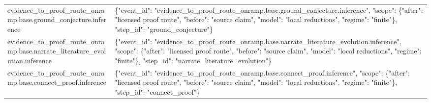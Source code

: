 \documentclass[10pt,a4paper]{article}
\begin{document}
\begin{longtable}{@{}>{\raggedright\arraybackslash}p{.20\linewidth}>{\raggedright\arraybackslash}p{.67\linewidth}@{}}
\hypertarget{trace-scope-0e779a9114af220ab2}{evidence\_\allowbreak{}to\_\allowbreak{}proof\_\allowbreak{}route\_\allowbreak{}onramp.\allowbreak{}base.\allowbreak{}ground\_\allowbreak{}conjecture\allowbreak{}.\allowbreak{}inference} & \{"event\_\allowbreak{}id":\allowbreak{} "evidence\_\allowbreak{}to\_\allowbreak{}proof\_\allowbreak{}route\_\allowbreak{}onramp.\allowbreak{}base.\allowbreak{}ground\_\allowbreak{}conjecture\allowbreak{}.\allowbreak{}inference"\allowbreak{}, "scope":\allowbreak{} \{"after":\allowbreak{} "licensed proof route", "before":\allowbreak{} "source claim", "model":\allowbreak{} "local reductions\allowbreak{}", "regime":\allowbreak{} "finite"\},\allowbreak{} "step\_\allowbreak{}id":\allowbreak{} "ground\_\allowbreak{}conjecture\allowbreak{}"\}\\
\hypertarget{trace-scope-7d860ac90adab09aa4}{evidence\_\allowbreak{}to\_\allowbreak{}proof\_\allowbreak{}route\_\allowbreak{}onramp.\allowbreak{}base.\allowbreak{}narrate\_\allowbreak{}literature\allowbreak{}\_\allowbreak{}evolution.\allowbreak{}inference} & \{"event\_\allowbreak{}id":\allowbreak{} "evidence\_\allowbreak{}to\_\allowbreak{}proof\_\allowbreak{}route\_\allowbreak{}onramp.\allowbreak{}base.\allowbreak{}narrate\_\allowbreak{}literature\allowbreak{}\_\allowbreak{}evolution.\allowbreak{}inference"\allowbreak{}, "scope":\allowbreak{} \{"after":\allowbreak{} "licensed proof route", "before":\allowbreak{} "source claim", "model":\allowbreak{} "local reductions\allowbreak{}", "regime":\allowbreak{} "finite"\},\allowbreak{} "step\_\allowbreak{}id":\allowbreak{} "narrate\_\allowbreak{}literature\allowbreak{}\_\allowbreak{}evolution"\allowbreak{}\}\\
\hypertarget{trace-scope-c9d50518618bb6ccbc}{evidence\_\allowbreak{}to\_\allowbreak{}proof\_\allowbreak{}route\_\allowbreak{}onramp.\allowbreak{}base.\allowbreak{}connect\_\allowbreak{}proof.\allowbreak{}inference} & \{"event\_\allowbreak{}id":\allowbreak{} "evidence\_\allowbreak{}to\_\allowbreak{}proof\_\allowbreak{}route\_\allowbreak{}onramp.\allowbreak{}base.\allowbreak{}connect\_\allowbreak{}proof.\allowbreak{}inference"\allowbreak{}, "scope":\allowbreak{} \{"after":\allowbreak{} "licensed proof route", "before":\allowbreak{} "source claim", "model":\allowbreak{} "local reductions\allowbreak{}", "regime":\allowbreak{} "finite"\},\allowbreak{} "step\_\allowbreak{}id":\allowbreak{} "connect\_\allowbreak{}proof"\}\\

\end{longtable}
\end{document}
